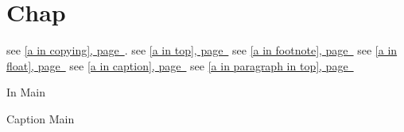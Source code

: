 \documentclass{book}
\begin{document}
\label{anchor:Top}%
\label{anchor:a-in-top}%
\label{anchor:a-in-paragraph-in-top}%
\label{anchor:a-in-float}%
\label{anchor:My-Flist}%
\chapter{{Chap}}
\label{anchor:chapter}%

see \hyperref[anchor:a-in-copying]{[a in copying], page~\pageref*{anchor:a-in-copying}}.
see \hyperref[anchor:a-in-top]{[a in top], page~\pageref*{anchor:a-in-top}}
see \hyperref[anchor:a-in-footnote]{[a in footnote], page~\pageref*{anchor:a-in-footnote}}
see \hyperref[anchor:a-in-float]{[a in float], page~\pageref*{anchor:a-in-float}}
see \hyperref[anchor:a-in-caption]{[a in caption], page~\pageref*{anchor:a-in-caption}}
see \hyperref[anchor:a-in-paragraph-in-top]{[a in paragraph in top], page~\pageref*{anchor:a-in-paragraph-in-top}}

%

\printindex[cp]

\begin{TexinfoFloatlist}
In Main
\caption{Caption Main}

\label{anchor:Main-Flist}%
\end{TexinfoFloatlist}

\end{document}
